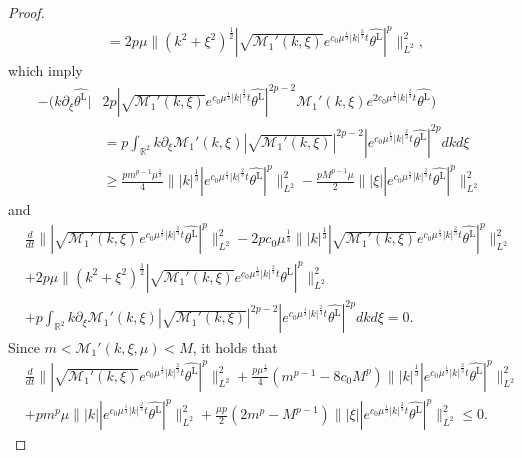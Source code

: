 \documentclass[reqno, 12pt]{amsart} %
\theoremstyle{plain} %
\theoremstyle{definition}
\theoremstyle{remark}
\numberwithin{equation}{section} %
\begin{document}
\begin{proof}
\begin{align*}
			&=  2p\mu \|  (k^2 + \xi^2)^\frac12 | \sqrt{\mathcal{M}_1'(k, \xi)} e^{c_0 \mu^\frac13 |k|^\frac23 t} \widehat{\theta^{\mathrm{L}} }|^{p}  \|_{L^2}^2,
		\end{align*}
		which imply
		\begin{align*}
			-\big( k\partial_\xi  \widehat{\theta^{\mathrm{L}}} \big| &2p | \sqrt{\mathcal{M}_1'(k, \xi)} e^{c_0 \mu^\frac13 |k|^\frac23 t} \widehat{\theta^{\mathrm{L}} }|^{2p-2} \mathcal{M}_1'(k, \xi) e^{2c_0 \mu^\frac13 |k|^\frac23 t} \widehat{\theta^{\mathrm{L}} } \big) \\
			&= p \int_{\mathbb{R}^2} k\partial_\xi  \mathcal{M}_1'(k, \xi) | \sqrt{\mathcal{M}_1'(k, \xi)} |^{2p-2} |e^{c_0 \mu^\frac13 |k|^\frac23 t} \widehat{\theta^{\mathrm{L}} }|^{2p} dkd\xi  \\
			&\geq  \frac{pm^{p-1} \mu^\frac13 }{4} \| |k|^\frac13 |e^{c_0 \mu^\frac13 |k|^\frac23 t} \widehat{\theta^{\mathrm{L}} }|^{p} \|_{L^2}^2  -  \frac{pM^{p-1} \mu}{2} \| |\xi| |e^{c_0 \mu^\frac13 |k|^\frac23 t} \widehat{\theta^{\mathrm{L}} }|^{p} \|_{L^2}^2
		\end{align*}
		and
		\begin{align*}
			&\frac{d}{dt} \| | \sqrt{\mathcal{M}_1'(k, \xi)} e^{c_0 \mu^\frac13 |k|^\frac23 t} \widehat{\theta^{\mathrm{L}} }|^p \|_{L^2}^2  - 2p c_0 \mu^\frac13 \| |k|^\frac13 | \sqrt{\mathcal{M}_1'(k, \xi)} e^{c_0 \mu^\frac13 |k|^\frac23 t} \widehat{\theta^{\mathrm{L}} }|^p\|_{L^2}^2 \\
			&+2p\mu \|  (k^2 + \xi^2)^\frac12 | \sqrt{\mathcal{M}_1'(k, \xi)} e^{c_0 \mu^\frac13 |k|^\frac23 t} \widehat{\theta^{\mathrm{L}} }|^{p}  \|_{L^2}^2 \\
			& + p \int_{\mathbb{R}^2} k\partial_\xi  \mathcal{M}_1'(k, \xi) | \sqrt{\mathcal{M}_1'(k, \xi)} |^{2p-2} |e^{c_0 \mu^\frac13 |k|^\frac23 t} \widehat{\theta^{\mathrm{L}} }|^{2p} dkd\xi = 0.
		\end{align*}
		Since $m<\mathcal{M}_1'(k, \xi, \mu)<M $, it holds that
		\begin{align*}
			& \frac{d}{dt} \| | \sqrt{\mathcal{M}_1'(k, \xi)} e^{c_0 \mu^\frac13 |k|^\frac23 t} \widehat{\theta^{\mathrm{L}} }|^p \|_{L^2}^2  + \frac{p\mu^\frac13}{4} (m^{p-1}  - 8c_0 M^p)  \| |k|^\frac13 | e^{c_0 \mu^\frac13 |k|^\frac23 t} \widehat{\theta^{\mathrm{L}} }|^p\|_{L^2}^2 \\
			&+ p m^p\mu \|  |k| |  e^{c_0 \mu^\frac13 |k|^\frac23 t} \widehat{\theta^{\mathrm{L}} }|^{p}  \|_{L^2}^2  + \frac{\mu p}{2}(2m^p-M^{p-1})  \| |\xi| |e^{c_0 \mu^\frac13 |k|^\frac23 t} \widehat{\theta^{\mathrm{L}} }|^{p} \|_{L^2}^2 \leq 0.

\end{align*}
\end{proof}
\end{document}
